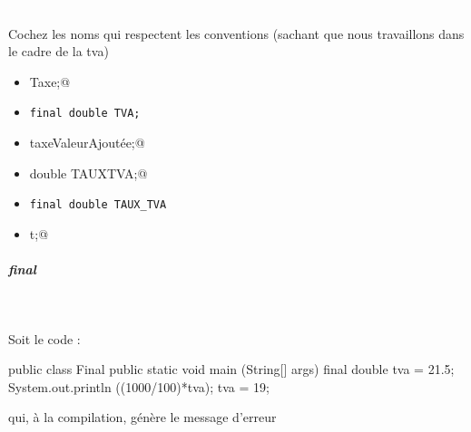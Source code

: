 \documentclass[11pt,a4paper]{article}
\begin{document}
                \textcolor{white}{.} \par
            Cochez les noms qui respectent les conventions (sachant que nous travaillons dans le cadre de la tva)
            \begin{itemize} 
        
            \item[ \ding{"6F} ] \verb@double Taxe;@
        
            \item[ \ding{"6F} ] \verb|final double TVA;|
        
            \item[ \ding{"6F} ] \verb@double taxeValeurAjoutée;@
        
            \item[ \ding{"6F} ] \verb@final double TAUXTVA;@
        
            \item[ \ding{"6F} ] \verb|final double TAUX_TVA|
        
            \item[ \ding{"6F} ] \verb@double t;@
        
            \end{itemize} 
        
			
		\subparagraph{final} 
		
					\textcolor{white}{.} \par
				
            \par
        
					Soit le code :
				
            \par
        \begin{Java}
	public class Final {  
		public static void main (String[] args) {
			final double tva = 21.5; 
			System.out.println ((1000/100)*tva);  
			tva = 19;
		}
	}			\end{Java}
					qui, \`a la compilation, g\'en\`ere le message d'erreur 
				
\end{document}
